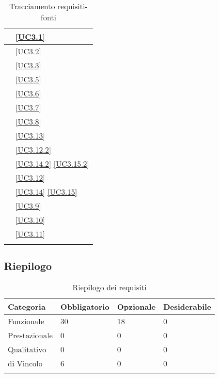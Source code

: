 \begin{longtable}{|P{6cm}|P{6cm}|}
	\hline {} & \ref{UC3.1} \\
	\hline {} & \ref{UC3.2} \\
	\hline {} & \ref{UC3.3} \\
	\hline {} & \ref{UC3.5} \\
	\hline {} & \ref{UC3.6} \\
	\hline {} & \ref{UC3.7} \\
	\hline {} & \ref{UC3.8} \\
	\hline {} & \ref{UC3.13} \\
	\hline {} & \ref{UC3.12.2} \\
	\hline {} & \ref{UC3.14.2} \linebreak \ref{UC3.15.2} \\
	\hline {} & \ref{UC3.12} \\
	\hline {} & \ref{UC3.14} \linebreak \ref{UC3.15} \\
	\hline {} & \ref{UC3.9} \\
	\hline {} & \ref{UC3.10} \\
	\hline {} & \ref{UC3.11} \\	
	\hline
	\caption{Tracciamento requisiti-fonti}
\end{longtable}

\subsection{Riepilogo}

\begin{longtable}{|P{3cm}|P{3cm}|P{3cm}|P{3cm}|}
	\hline \textbf{Categoria} & \textbf{Obbligatorio} & \textbf{Opzionale} & \textbf{Desiderabile} \\
	\hline Funzionale & 30 & 18 & 0 \\
	\hline Prestazionale & 0 & 0 & 0 \\
	\hline Qualitativo & 0 & 0 & 0 \\
	\hline di Vincolo & 6 & 0 & 0 \\
	\hline
	\caption{Riepilogo dei requisiti}
\end{longtable}
